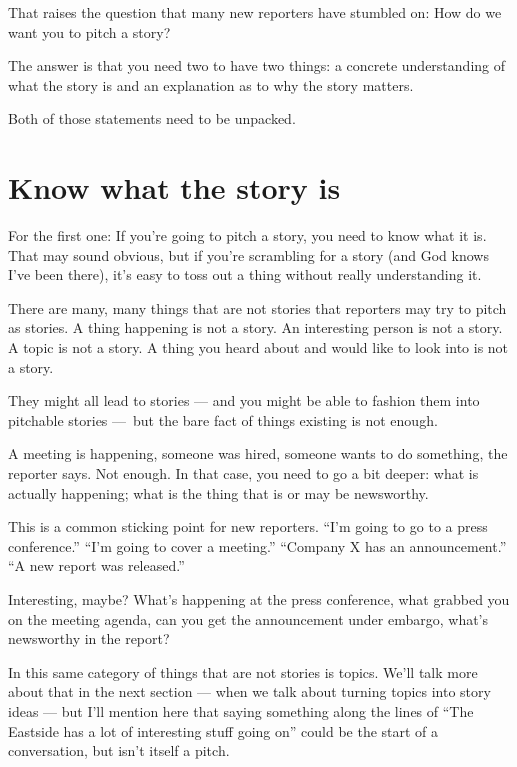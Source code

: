 \documentclass[
  12pt,
  american,
  letterpaperpaper,
  extrafontsizes,onecolumn,openright
  ]{memoir}
\begin{document}
That raises the question that many new reporters have stumbled on: How do we want you to pitch a story?

The answer is that you need two to have two things: a concrete understanding of what the story is and an explanation as to why the story matters.

Both of those statements need to be unpacked.

\hypertarget{know-what-the-story-is}{%
\section*{Know what the story is}\label{know-what-the-story-is}}

For the first one: If you're going to pitch a story, you need to know what it is. That may sound obvious, but if you're scrambling for a story (and God knows I've been there), it's easy to toss out a thing without really understanding it.

There are many, many things that are not stories that reporters may try to pitch as stories. A thing happening is not a story. An interesting person is not a story. A topic is not a story. A thing you heard about and would like to look into is not a story.

They might all lead to stories --- and you might be able to fashion them into pitchable stories ---~but the bare fact of things existing is not enough.

A meeting is happening, someone was hired, someone wants to do something, the reporter says. Not enough. In that case, you need to go a bit deeper: what is actually happening; what is the thing that is or may be newsworthy.

This is a common sticking point for new reporters. \enquote{I'm going to go to a press conference.} \enquote{I'm going to cover a meeting.} \enquote{Company X has an announcement.} \enquote{A new report was released.}

Interesting, maybe? What's happening at the press conference, what grabbed you on the meeting agenda, can you get the announcement under embargo, what's newsworthy in the report?

In this same category of things that are not stories is topics. We'll talk more about that in the next section --- when we talk about turning topics into story ideas --- but I'll mention here that saying something along the lines of \enquote{The Eastside has a lot of interesting stuff going on} could be the start of a conversation, but isn't itself a pitch.
\end{document}

